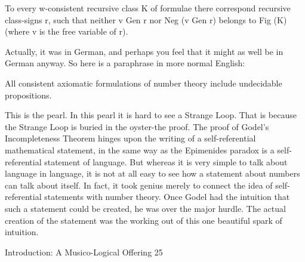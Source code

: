     To every w-consistent recursive class K of formulae there correspond recursive
    class-signs r, such that neither v Gen r nor Neg (v Gen r) belongs to Fig (K) (where v
    is the free variable of r).

Actually, it was in German, and perhaps you feel that it might as well be in German
anyway. So here is a paraphrase in more normal English:

    All consistent axiomatic formulations of number theory
    include undecidable propositions.

This is the pearl.
   In this pearl it is hard to see a Strange Loop. That is because the Strange Loop is buried
in the oyster-the proof. The proof of Godel's Incompleteness Theorem hinges upon the
writing of a self-referential mathematical statement, in the same way as the Epimenides
paradox is a self-referential statement of language. But whereas it is very simple to talk
about language in language, it is not at all easy to see how a statement about numbers can
talk about itself. In fact, it took genius merely to connect the idea of self-referential
statements with number theory. Once Godel had the intuition that such a statement could
be created, he was over the major hurdle. The actual creation of the statement was the
working out of this one beautiful spark of intuition.




Introduction: A Musico-Logical Offering                                                     25

